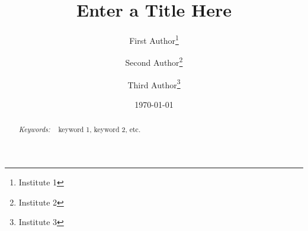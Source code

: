 \documentclass[12pt]{article}
\begin{document}
\title{Enter a Title Here}
\author{
  First Author\thanks{Institute 1} \and
  Second Author\thanks{Institute 2} \and
  Third Author\thanks{Institute 3}
}
\date{\today}
\maketitle

\begin{abstract}
  \noindent
  

  \noindent
  {\em Keywords:} ~ keyword 1, keyword 2, etc.
\end{abstract}

\sloppy



\clearpage


\end{document}
